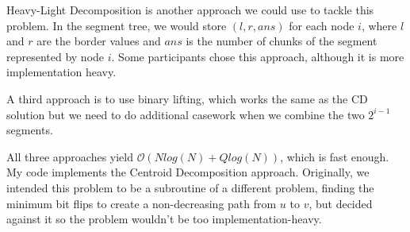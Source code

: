 \documentclass[15pt]{article}
\begin{document}
Heavy-Light Decomposition is another approach we could use to tackle this problem. In the segment tree, we would store $(l, r, ans)$ for each node $i$, where $l$ and $r$ are the border values and $ans$ is the number of chunks of the segment represented by node $i$. Some participants chose this approach, although it is more implementation heavy. 

A third approach is to use binary lifting, which works the same as the CD solution but we need to do additional casework when we combine the two $2^{i-1}$ segments.

All three approaches yield $\mathcal{O}(N log(N) + Q log(N))$, which is fast enough. My code implements the Centroid Decomposition approach. Originally, we intended this problem to be a subroutine of a different problem, finding the minimum bit flips to create a non-decreasing path from $u$ to $v$, but decided against it so the problem wouldn't be too implementation-heavy.
\end{document}
